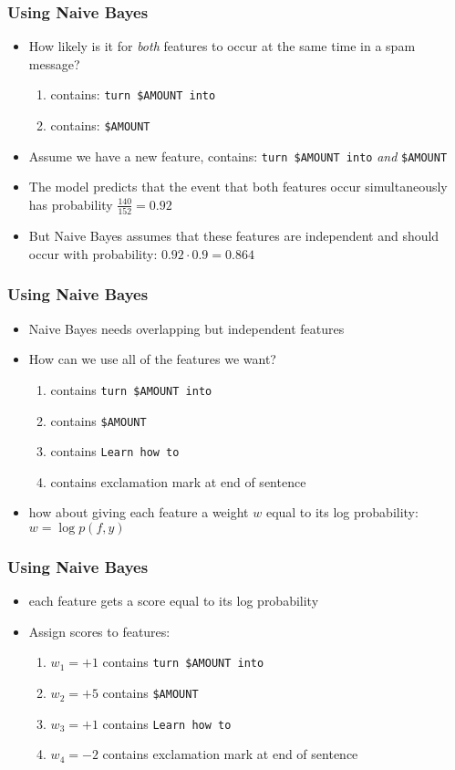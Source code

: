 \begin{frame}
\frametitle{Using Naive Bayes}
\begin{itemize}[<+->]
\item How likely is it for {\em both} features to occur at the same time
in a spam message?
  \begin{enumerate}[<+->]
  \item contains: {\tt turn \$AMOUNT into }
  \item contains: {\tt \$AMOUNT}
  \end{enumerate}
\item Assume we have a new feature, contains: {\tt turn \$AMOUNT into} {\em and} {\tt \$AMOUNT}
\item The model predicts that the event that both features occur
  simultaneously has probability $\frac{140}{152} = 0.92$
\item But Naive Bayes assumes that these features are independent
and should occur with probability: $0.92 \cdot 0.9 = 0.864$
\end{itemize}
\end{frame}

\begin{frame}
\frametitle{Using Naive Bayes}
\begin{itemize}[<+->]
\item Naive Bayes needs overlapping but independent features
\item How can we use all of the features we want?
  \begin{enumerate}[<+->]
  \item contains {\tt turn \$AMOUNT into }
  \item contains {\tt \$AMOUNT}
  \item contains {\tt Learn how to }
  \item contains exclamation mark at end of sentence
  \end{enumerate}
\item how about giving each feature a weight $w$ equal to its log probability: $w = \log p(f, y)$
\end{itemize}
\end{frame}

\begin{frame}
\frametitle{Using Naive Bayes}
\begin{itemize}[<+->]
\item each feature gets a score equal to its log probability
\item Assign scores to features:
  \begin{enumerate}[<+->]
  \item $w_1 = +1$ contains {\tt turn \$AMOUNT into }
  \item $w_2 = +5$ contains {\tt \$AMOUNT}
  \item $w_3 = +1$ contains {\tt Learn how to }
  \item $w_4 = -2$ contains exclamation mark at end of sentence
  \end{enumerate}
\end{itemize}
\end{frame}

